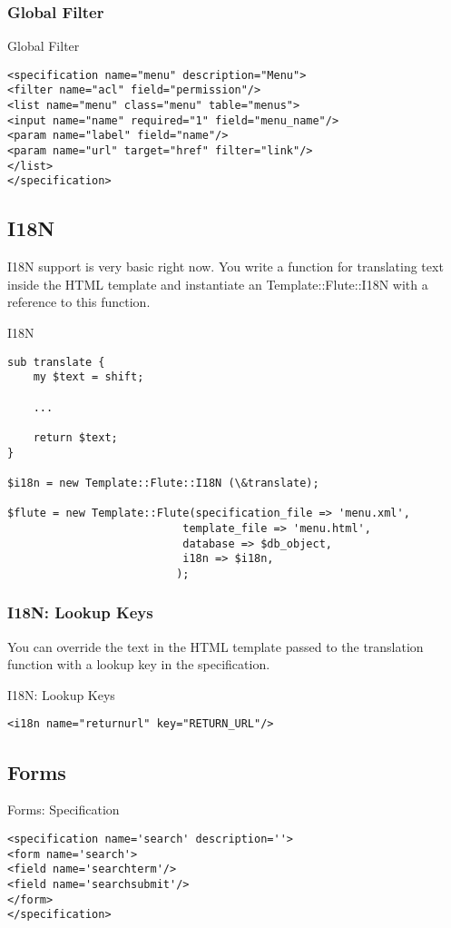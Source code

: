 \subsubsection{Global Filter}
\begin{frame}[fragile]{Global Filter}
\begin{lstlisting}
<specification name="menu" description="Menu">
<filter name="acl" field="permission"/>
<list name="menu" class="menu" table="menus">
<input name="name" required="1" field="menu_name"/>
<param name="label" field="name"/>
<param name="url" target="href" filter="link"/>
</list>
</specification>
\end{lstlisting}
\end{frame}

\subsection{I18N}
I18N support is very basic right now. You write a function for
translating text inside the HTML template and instantiate an
Template::Flute::I18N with a reference to this function. 
\begin{frame}[fragile]{I18N}
\begin{lstlisting}
sub translate {
    my $text = shift;

    ...

    return $text;
}

$i18n = new Template::Flute::I18N (\&translate);

$flute = new Template::Flute(specification_file => 'menu.xml',
						   template_file => 'menu.html',
						   database => $db_object,
						   i18n => $i18n,
						  );
\end{lstlisting}
\end{frame}

\subsubsection{I18N: Lookup Keys}
You can override the text in the HTML template passed to the
translation function with a lookup key in the specification.
\begin{frame}[fragile]{I18N: Lookup Keys}
\begin{lstlisting}
<i18n name="returnurl" key="RETURN_URL"/>
\end{lstlisting}
\end{frame}

\subsection{Forms}
\begin{frame}[fragile]{Forms: Specification}
\begin{lstlisting}
<specification name='search' description=''>
<form name='search'>
<field name='searchterm'/>
<field name='searchsubmit'/>
</form>
</specification>
\end{lstlisting}
\end{frame}

